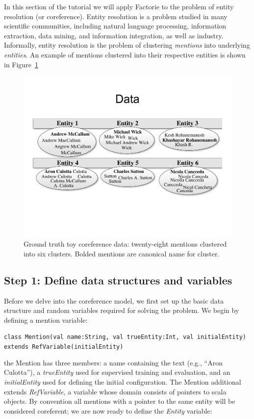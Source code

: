 \documentclass[]{manual}
\begin{document}
In this section of the tutorial we will apply Factorie to the problem
of entity resolution (or coreference). Entity resolution is a problem
studied in many scientific communities, including natural language
processing, information extraction, data mining, and information
integration, as well as industry. Informally, entity resolution is the
problem of clustering {\em mentions} into underlying {\em
  entities}. An example of mentions clustered into their respective
entities is shown in Figure~\ref{fig:tutorial-coref-toy-data}


\begin{figure}[h]
\begin{center}
\includegraphics[width=0.88 \textwidth]{figs/coref-toy-data}
\caption{Ground truth toy coreference data: twenty-eight mentions
  clustered into six clusters. Bolded mentions are canonical name for cluster.}
\label{fig:tutorial-coref-toy-data}
\end{center}
\end{figure}


\subsection{Step 1: Define data structures and variables}
Before we delve into the coreference model, we first set up the basic
data structure and random variables required for solving the
problem. We begin by defining a mention variable:

\lstinline!class Mention(val name:String, val trueEntity:Int, val initialEntity) extends RefVariable(initialEntity)!

\noindent the Mention has three members: a name containing the text
(e.g., ``Aron Culotta''), a {\em trueEntity} used for supervised
training and evaluation, and an {\em initialEntity} used for defining
the initial configuration. The Mention additional extends {\em
  RefVariable}, a variable whose domain consists of pointers to scala
objects. By convention all mentions with a pointer to the same entity
will be considered coreferent; we are now ready to define the {\em
  Entity} variable:
\end{document}
